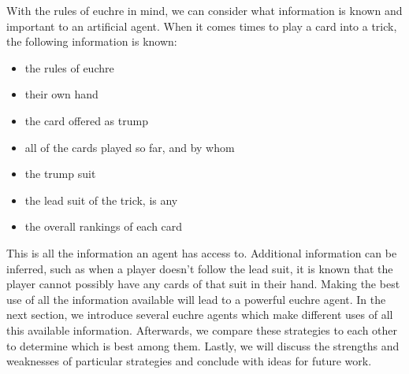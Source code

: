 With the rules of euchre in mind, we can consider what information is known and important to an artificial agent. When it comes times to play a card
into a trick, the following information is known:
\begin{itemize}[noitemsep, label={}]
    \item the rules of euchre
    \item their own hand
    \item the card offered as trump
    \item all of the cards played so far, and by whom
    \item the trump suit
    \item the lead suit of the trick, is any
    \item the overall rankings of each card
\end{itemize}

This is all the information an agent has access to. Additional information can be inferred, such as when a player doesn't follow the lead suit,
it is known that the player cannot possibly have any cards of that suit in their hand. Making the best use of all the information available
will lead to a powerful euchre agent. In the next section, we introduce several euchre agents which make different uses of all this available
information. Afterwards, we compare these strategies to each other to determine which is best among them. Lastly, we will discuss the
strengths and weaknesses of particular strategies and conclude with ideas for future work.
